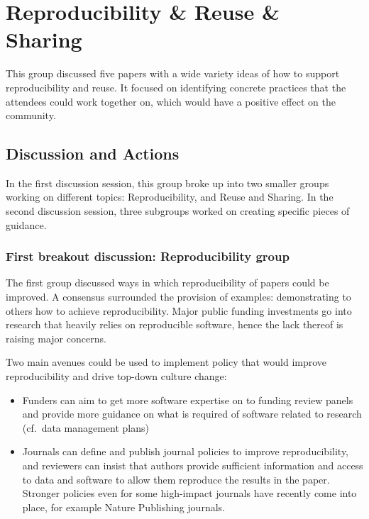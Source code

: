 \documentclass[11pt, oneside]{amsart}
\newcommand{\todo}[1]{{\color{blue}$\blacksquare$~\textsf{[TODO: #1]}}}
\newcommand{\note}[1]{ {\textcolor{blueish}    { ***Note:      #1 }}}
\begin{document}
\section{Reproducibility \& Reuse \& Sharing} \label{sec:reproduce}


This group discussed five papers with a wide variety ideas of how to support
reproducibility and reuse. It focused on identifying concrete practices that the attendees
could work together on, which would have a positive effect on the community.

\subsection{Discussion and Actions}

In the first discussion session, this group broke up into two smaller groups
working on different topics: Reproducibility, and Reuse and Sharing. In the
second discussion session, three subgroups worked on creating specific pieces of
guidance.

\subsubsection{First breakout discussion: Reproducibility group}

The first group discussed ways in which reproducibility of papers could be
improved. A consensus surrounded the provision of examples: demonstrating to
others how to achieve reproducibility. Major public funding investments go into
research that heavily relies on reproducible software, hence the lack thereof
is raising major concerns.

Two main avenues could be used to implement policy that would improve
reproducibility and drive top-down culture change:
\begin{itemize}
\item Funders can aim to get more software expertise on to funding review panels
and provide more guidance on what is required of software related to research
(cf.\ data management plans)

\item Journals can define and publish journal policies to improve
reproducibility, and reviewers can insist that authors provide sufficient
information and access to data and software to allow them reproduce the results
in the paper. Stronger policies even for some high-impact journals have recently
come into place, for example Nature Publishing journals.
\end{itemize}
\end{document}
